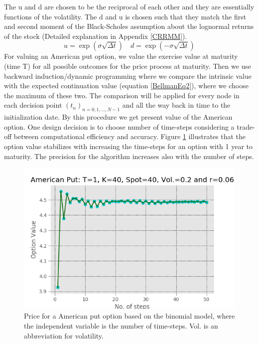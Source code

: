 The u and d are chosen to be the reciprocal of each other and they are essentially functions of the volatility. The d and u is chosen such that they match the first and second moment of the Black-Scholes assumption about the lognormal returns of the stock (Detailed explanation in Appendix \ref{CRRMM}).
$$u= \exp(\sigma \sqrt{\Delta t}) \quad d= \exp(-\sigma \sqrt{\Delta t})$$
For valuing an American put option, we value the exercise value at maturity (time T) for all possible outcomes for the price process at maturity. Then we use backward induction/dynamic programming where we compare the intrinsic value with the expected continuation value (equation \eqref{BellmanEq2}), where we choose the maximum of these two. The comparison will be applied for every node in each decision point $(t_{n})_{n=0,1,\ldots,N-1}$ and all the way back in time to the initialization date. By this procedure we get present value of the American option. One design decision is to choose number of time-steps considering a trade-off between computational efficiency and accuracy. Figure \ref{fig:binConv} illustrates that the option value stabilizes with increasing the time-steps for an option with 1 year to maturity. The precision for the algorithm increases also with the number of steps.\\

\begin{figure}[th]
\centering
\includegraphics{Figures/binConv.png}
\decoRule
\caption[Convergence Of Binomial Model]{Price for a American put option based on the binomial model, where the independent variable is the number of time-steps. Vol. is an abbreviation for volatility.}
\label{fig:binConv}
\end{figure}

